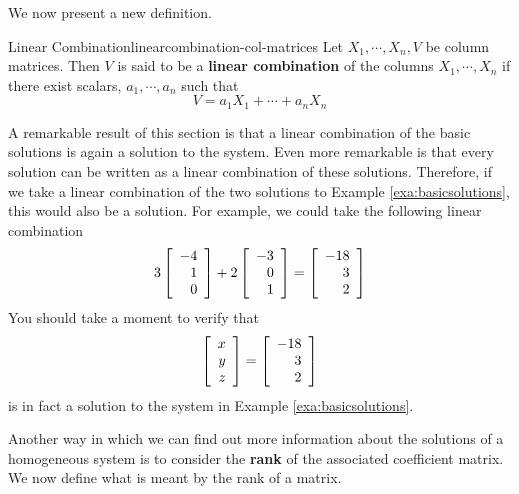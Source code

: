 We now present a new definition. 

\begin{definition}{Linear Combination}{linearcombination-col-matrices}
Let $X_1,\cdots ,X_n,V$ be column matrices. Then 
$V$ is said to be a \textbf{linear combination}
 of the columns $X_1,\cdots , X_n $ 
if there exist scalars, $a_{1},\cdots ,a_{n}$ such
that
\begin{equation*}
V = a_1 X_1 + \cdots + a_n X_n
\end{equation*}
\end{definition}

A remarkable result of this section is that a linear combination of the basic solutions is again a solution to the system.
Even more remarkable is that every solution can be written as a linear combination of these solutions. 
Therefore, if we take a linear combination of the two solutions to Example \ref{exa:basicsolutions},
this would also be a solution. 
For example, we could take the following linear combination
\begin{equation*}
3
\left[
\begin{array}{r}
-4 \\
1 \\
0
\end{array}
\right]
+
2
\left[
\begin{array}{r}
-3 \\
0\\
1
\end{array}
\right]
 =
\left[
\begin{array}{r}
-18 \\
3 \\
2
\end{array}
\right]
\end{equation*}
You should take a moment to verify that
\begin{equation*}
\left[
\begin{array}{r}
x \\
y \\
z
\end{array}
\right]
=
\left[
\begin{array}{r}
-18 \\
3 \\
2
\end{array}
\right]
\end{equation*}
is in fact a solution to the system in Example \ref{exa:basicsolutions}.

Another way in which we can find out more information about the solutions of 
a homogeneous system is to consider the \textbf{rank} of the associated coefficient matrix. We
now define what is meant by the rank of a matrix.

